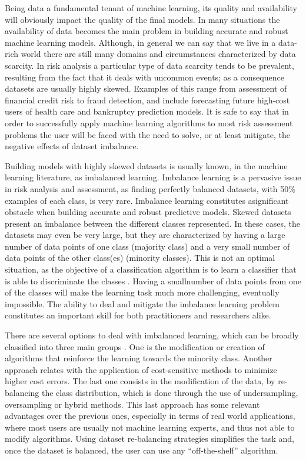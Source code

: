 \documentclass[parskip=full]{scrartcl}
\begin{document}
Being data a fundamental tenant of machine learning, its quality and
availability will obviously impact the quality of the final models. In many
situations the availability of data becomes the main problem in building
accurate and robust machine learning models. Although, in general we can say
that we live in a data-rich world there are still many domains and circumstances
characterized by data scarcity. In risk analysis a particular type of data
scarcity tends to be prevalent, resulting from the fact that it deals with
uncommon events; as a consequence datasets are usually highly skewed. Examples
of this range from assessment of financial credit risk to fraud detection, and
include forecasting future high-cost users of health care and bankruptcy
prediction models. It is safe to say that in order to successfully apply machine
learning algorithms to most risk assessment problems the user will be faced with
the need to solve, or at least mitigate, the negative effects of dataset
imbalance.

Building models with highly skewed datasets is usually known, in the machine 
learning literature, as imbalanced learning. Imbalance learning is a pervasive 
issue in risk analysis and assessment, as finding perfectly balanced datasets, 
with 50\% examples of each class, is very rare. Imbalance learning constitutes 
asignificant obstacle when building accurate and robust predictive models. 
Skewed datasets present an imbalance between the different classes represented. 
In these cases, the datasets may even be very large, but they are characterized 
by having a large number of data points of one class (majority class) and a 
very small number of data points of the other class(es) (minority classes). 
This is not an optimal situation, as the objective of a classification 
algorithm is to learn a classifier that is able to discriminate the classes 
\cite{HaiboHe2009}. Having a smallnumber of data points from one of the classes 
will make the learning task much more challenging, eventually impossible. The 
ability to deal and mitigate the imbalance learning problem constitutes an 
important skill for both practitioners and researchers alike.

There are several options to deal with imbalanced learning, which can be broadly
classified into three main groups \cite{Fernandez2013}. One is the
modification or creation of algorithms that reinforce the learning towards the
minority class. Another approach relates with the application of cost-sensitive
methods to minimize higher cost errors. The last one consists in the
modification of the data, by re-balancing the class distribution, which is done
through the use of undersampling, oversampling or hybrid methods. This last
approach has some relevant advantages over the previous ones, especially in
terms of real world applications, where most users are usually not machine
learning experts, and thus not able to modify algorithms. Using dataset
re-balancing strategies simplifies the task and, once the dataset is balanced,
the user can use any “off-the-shelf” algorithm.
\end{document}
